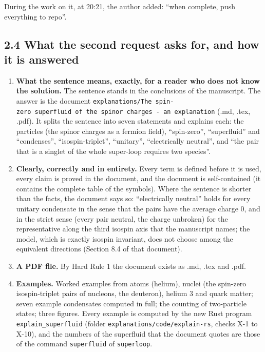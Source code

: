 \documentclass[
  10pt,
]{article}
\providecommand{\tightlist}{%
  \setlength{\itemsep}{0pt}\setlength{\parskip}{0pt}}
\begin{document}
During the work on it, at 20:21, the author added: ``when complete, push
everything to repo''.

\hypertarget{what-the-second-request-asks-for-and-how-it-is-answered}{%
\subsection{2.4 What the second request asks for, and how it is
answered}\label{what-the-second-request-asks-for-and-how-it-is-answered}}

\begin{enumerate}
\def\labelenumi{\arabic{enumi}.}
\tightlist
\item
  \textbf{What the sentence means, exactly, for a reader who does not
  know the solution.} The sentence stands in the conclusions of the
  manuscript. The answer is the document
  \texttt{explanations/The\ spin-zero\ superfluid\ of\ the\ spinor\ charges\ -\ an\ explanation}
  (.md, .tex, .pdf). It splits the sentence into seven statements and
  explains each: the particles (the spinor charges as a fermion field),
  ``spin-zero'', ``superfluid'' and ``condenses'', ``isospin-triplet'',
  ``unitary'', ``electrically neutral'', and ``the pair that is a
  singlet of the whole super-loop requires two species''.
\item
  \textbf{Clearly, correctly and in entirety.} Every term is defined
  before it is used, every claim is proved in the document, and the
  document is self-contained (it contains the complete table of the
  symbols). Where the sentence is shorter than the facts, the document
  says so: ``electrically neutral'' holds for every unitary condensate
  in the sense that the pairs have the average charge 0, and in the
  strict sense (every pair neutral, the charge unbroken) for the
  representative along the third isospin axis that the manuscript names;
  the model, which is exactly isospin invariant, does not choose among
  the equivalent directions (Section 8.4 of that document).
\item
  \textbf{A PDF file.} By Hard Rule 1 the document exists as .md, .tex
  and .pdf.
\item
  \textbf{Examples.} Worked examples from atoms (helium), nuclei (the
  spin-zero isospin-triplet pairs of nucleons, the deuteron), helium 3
  and quark matter; seven example condensates computed in full; the
  counting of two-particle states; three figures. Every example is
  computed by the new Rust program \texttt{explain\_superfluid} (folder
  \texttt{explanations/code/explain-rs}, checks X-1 to X-10), and the
  numbers of the superfluid that the document quotes are those of the
  command \texttt{superfluid} of \texttt{superloop}.
\end{enumerate}
\end{document}
